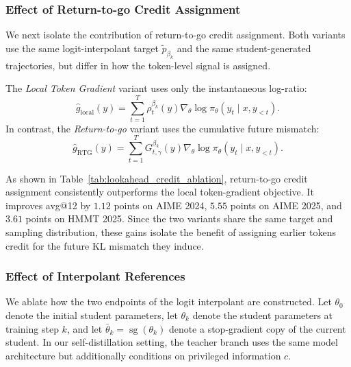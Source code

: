 

\subsubsection{Effect of Return-to-go Credit Assignment}
\label{sec:ablation_lookahead_loss}

We next isolate the contribution of return-to-go credit assignment. Both variants use the
same logit-interpolant target $\tilde p_{\beta_k}$ and the same student-generated
trajectories, but differ in how the token-level signal is assigned.

The \emph{Local Token Gradient} variant uses only the instantaneous log-ratio:
\begin{equation}
    \widehat{g}_{\mathrm{local}}(y)
    =
    \sum_{t=1}^{T}
    \rho_t^{\beta_k}(y)
    \nabla_\theta
    \log \pi_\theta(y_t\mid x,y_{<t}).
    \label{eq:ablation_local_gradient}
\end{equation}
In contrast, the \emph{Return-to-go} variant uses the cumulative future mismatch:
\begin{equation}
    \widehat{g}_{\mathrm{RTG}}(y)
    =
    \sum_{t=1}^{T}
    G_{t,\gamma}^{\beta_k}(y)
    \nabla_\theta
    \log \pi_\theta(y_t\mid x,y_{<t}).
    \label{eq:ablation_rtg_gradient}
\end{equation}

As shown in Table~\ref{tab:lookahead_credit_ablation}, return-to-go credit assignment
consistently outperforms the local token-gradient objective. It improves avg@12 by
$1.12$ points on AIME 2024, $5.55$ points on AIME 2025, and $3.61$ points on
HMMT 2025. Since the two variants share the same target and sampling distribution, these
gains isolate the benefit of assigning earlier tokens credit for the future KL mismatch they
induce.



\subsubsection{Effect of Interpolant References}
\label{sec:ablation_interpolant_reference}

We ablate how the two endpoints of the logit interpolant are constructed. Let
$\theta_0$ denote the initial student parameters, let $\theta_k$ denote the student
parameters at training step $k$, and let
$\bar{\theta}_k=\operatorname{sg}(\theta_k)$ denote a stop-gradient copy of the current
student. In our self-distillation setting, the teacher branch uses the same model
architecture but additionally conditions on privileged information $c$.

